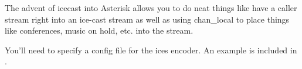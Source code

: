 The advent of icecast into Asterisk allows you to do neat things like have
a caller stream right into an ice-cast stream as well as using chan\_local
to place things like conferences, music on hold, etc. into the stream.

You'll need to specify a config file for the ices encoder.  An example is
included in .

